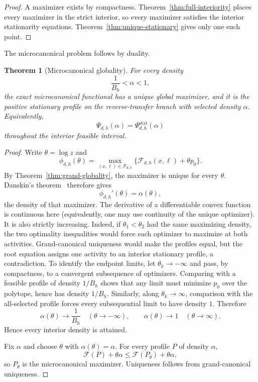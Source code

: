 \documentclass[11pt]{amsart}
\newtheorem{theorem}{Theorem}[section]
\theoremstyle{definition}
\newcommand{\Fcal}{\mathcal F}
\newcommand{\Pcal}{\mathcal P}
\begin{document}
\begin{proof}
A maximizer exists by compactness.  Theorem~\ref{thm:full-interiority} places every maximizer in the strict interior, so every maximizer satisfies the interior stationarity equations.  Theorem~\ref{thm:unique-stationary} gives only one such point.
\end{proof}

The microcanonical problem follows by duality.

\begin{theorem}[Microcanonical globality]\label{thm:micro-globality}
For every density
\[
 \frac1{B_h}<\alpha<1,
\]
the exact microcanonical functional has a unique global maximizer, and it is the positive stationary profile on the reverse-transfer branch with selected density $\alpha$.  Equivalently,
\[
 \boxed{
 \Psi_{d,h}(\alpha)=\Psi^{\mathrm{stat}}_{d,h}(\alpha)
 }
\]
throughout the interior feasible interval.
\end{theorem}

\begin{proof}
Write $\theta=\log z$ and
\[
 \phi_{d,h}(\theta)
 =\max_{(x,\ell)\in\Pcal_{d,h}}
 \{\Fcal_{d,h}(x,\ell)+\theta p_0\}.
\]
By Theorem~\ref{thm:grand-globality}, the maximizer is unique for every $\theta$.  Danskin's theorem~\cite{RockafellarWets1998} therefore gives
\[
 \phi_{d,h}'(\theta)=\alpha(\theta),
\]
the density of that maximizer.  The derivative of a differentiable convex function is continuous here (equivalently, one may use continuity of the unique optimizer).  It is also strictly increasing.  Indeed, if $\theta_1<\theta_2$ had the same maximizing density, the two optimality inequalities would force each optimizer to maximize at both activities.  Grand-canonical uniqueness would make the profiles equal, but the root equation assigns one activity to an interior stationary profile, a contradiction.  To identify the endpoint limits, let $\theta_k\to-\infty$ and pass, by compactness, to a convergent subsequence of optimizers.  Comparing with a feasible profile of density $1/B_h$ shows that any limit must minimize $p_0$ over the polytope, hence has density $1/B_h$.  Similarly, along $\theta_k\to\infty$, comparison with the all-selected profile forces every subsequential limit to have density $1$.  Therefore
\[
 \alpha(\theta)\longrightarrow\frac1{B_h}
 \quad(\theta\to-\infty),
 \qquad
 \alpha(\theta)\longrightarrow1
 \quad(\theta\to\infty).
\]
Hence every interior density is attained.

Fix $\alpha$ and choose $\theta$ with $\alpha(\theta)=\alpha$.  For every profile $P$ of density $\alpha$,
\[
 \Fcal(P)+\theta\alpha
 \le
 \Fcal(P_\theta)+\theta\alpha,
\]
so $P_\theta$ is the microcanonical maximizer.  Uniqueness follows from grand-canonical uniqueness.
\end{proof}
\end{document}
